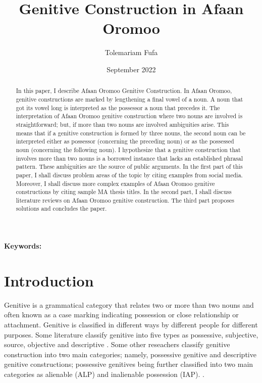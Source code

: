 \documentclass[11pt,a4paper]{article}
\title {Genitive Construction in Afaan Oromoo}
\author {Tolemariam Fufa}
\date{September 2022}
\begin{document}
	\newcommand\keywords[1]{%
		\begingroup
		\let\and\\
		\par
		\noindent\textbf{Keywords:}\\#1\par
		\endgroup
	}
	\maketitle
	\begin{abstract}
		In this paper, I describe Afaan Oromoo Genitive Construction. In Afaan Oromoo, genitive constructions are marked by lengthening a final vowel of a noun. 
		A noun that got its vowel long is interpreted as the possessor a noun that precedes it. The interpretation of Afaan Oromoo genitive construction where 
		two nouns are involved is straightforward; but, if more than two nouns are involved ambiguities arise. This means that if a genitive construction is 
		formed by three nouns, the second noun can be interpreted either as possessor (concerning the preceding noun) or as the possessed noun (concerning the 
		following noun). I hypothesize that a genitive construction that involves more than two nouns is a borrowed instance that lacks an established phrasal 
		pattern. These ambiguities are the source of public arguments. In the first part of this paper, I shall discuss problem areas of the topic by citing 
		examples from social media. Moreover, I shall discuss more complex examples of Afaan Oromoo genitive constructions by citing sample MA thesis titles. 
		In the second part, I shall discuss literature reviews on Afaan Oromoo genitive construction. The third part proposes solutions and concludes the paper. 
		
	
		
		
	\end{abstract}
	\keywords{}
	\newpage
	\section{Introduction}
	
	Genitive is a grammatical category that relates two or more than two nouns and often known as a case marking indicating possession or close relationship or attachment. Genitive is classified in different ways by different people for different purposes. Some literature classify genitive into five types as possessive, subjective, source, objective and descriptive \cite{ELT,vassiliadis1985translation}. Some other reseachers classify genitive construction into two main categories; namely, possessive genitive and descriptive genitive constructions; possessive genitives being further classified into two main categories as alienable  (ALP) and inalienable possession (IAP). \cite{gebregziabher2012alienable,ELT}. 
	
\end{document}
